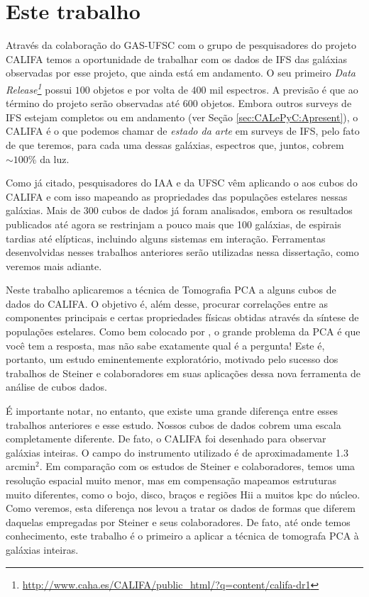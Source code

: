 \section{Este trabalho}
\label{sec:Intro:ThisWork}

Através da colaboração do GAS-UFSC com o grupo de pesquisadores do projeto CALIFA temos a oportunidade de trabalhar com
os dados de IFS das galáxias observadas por esse projeto, que ainda está em andamento. O seu primeiro {\em Data
Release\footnote{\url{http://www.caha.es/CALIFA/public_html/?q=content/califa-dr1}}} \citep[][DR1]{Husemann2013} possui
$100$ objetos e por volta de $400$ mil espectros. A previsão é que ao término do projeto serão observadas até $600$
objetos. Embora outros surveys de IFS estejam completos ou em andamento (ver Seção \ref{sec:CALePyC:Apresent}), o CALIFA
é o que podemos chamar de {\em estado da arte} em surveys de IFS, pelo fato de que teremos, para cada uma dessas
galáxias, espectros que, juntos, cobrem $\sim 100$\% da luz.

Como já citado, pesquisadores do IAA e da UFSC vêm aplicando o \starlight aos cubos do CALIFA e com isso mapeando as
propriedades das populações estelares nessas galáxias. Mais de 300 cubos de dados já foram analisados, embora os
resultados publicados até agora se restrinjam a pouco mais que 100 galáxias, de espirais tardias até elípticas,
incluindo alguns sistemas em interação. Ferramentas desenvolvidas nesses trabalhos anteriores serão utilizadas nessa
dissertação, como veremos mais adiante.

Neste trabalho aplicaremos a técnica de Tomografia PCA a alguns cubos de dados do CALIFA. O objetivo é, além desse,
procurar correlações entre as componentes principais e certas propriedades físicas obtidas através da síntese de
populações estelares. Como bem colocado por \citet{Steiner2009}, o grande problema da PCA é que você tem a resposta, mas
não sabe exatamente qual é a pergunta! Este é, portanto, um estudo eminentemente exploratório, motivado pelo sucesso dos
trabalhos de Steiner e colaboradores em suas aplicações dessa nova ferramenta de análise de cubos dados.

É importante notar, no entanto, que existe uma grande diferença entre esses trabalhos anteriores e esse estudo.  Nossos
cubos de dados cobrem uma escala completamente diferente. De fato, o CALIFA foi desenhado para observar galáxias
inteiras. O campo do instrumento utilizado é de aproximadamente 1.3 arcmin$^2$. Em comparação com os estudos de Steiner
e colaboradores, temos uma resolução espacial muito menor, mas em compensação mapeamos estruturas muito diferentes,
como o bojo, disco, braços e regiões H{\sc ii} a muitos kpc do núcleo. Como veremos, esta diferença nos levou a tratar
os dados de formas que diferem daquelas empregadas por Steiner e seus colaboradores. De fato, até onde temos conhecimento,
este trabalho é o primeiro a aplicar a técnica de tomografa PCA à galáxias inteiras.

